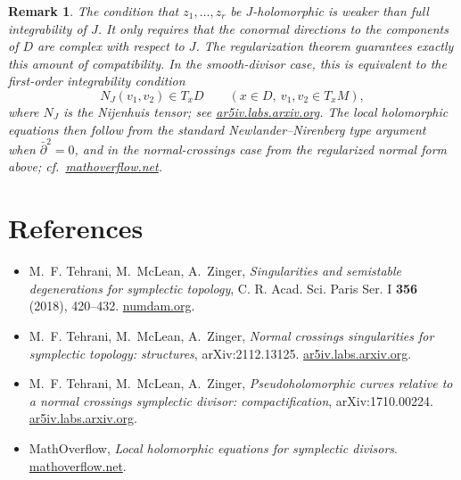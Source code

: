 \documentclass[11pt]{article}
\newtheorem{remark}[theorem]{Remark}
\begin{document}
\begin{remark}
The condition that $z_1,\dots,z_r$ be $J$-holomorphic is weaker than full integrability of $J$. It only requires that the conormal directions to the components of $D$ are complex with respect to $J$. The regularization theorem guarantees exactly this amount of compatibility. In the smooth-divisor case, this is equivalent to the first-order integrability condition
\[
N_J(v_1,v_2)\in T_xD\qquad(x\in D,\ v_1,v_2\in T_xM),
\]
where $N_J$ is the Nijenhuis tensor; see \href{https://ar5iv.labs.arxiv.org/html/1710.00224}{ar5iv.labs.arxiv.org}. The local holomorphic equations then follow from the standard Newlander--Nirenberg type argument when $\bar\partial^2=0$, and in the normal-crossings case from the regularized normal form above; cf.\ \href{https://mathoverflow.net/questions/154302/local-holomorphic-equations-for-symplectic-divisors}{mathoverflow.net}.
\end{remark}

\section*{References}
\begin{itemize}
\item M.~F. Tehrani, M.~McLean, A.~Zinger, \emph{Singularities and semistable degenerations for symplectic topology}, C. R. Acad. Sci. Paris Ser. I \textbf{356} (2018), 420--432. \href{https://www.numdam.org/item/10.1016/j.crma.2018.02.009.pdf}{numdam.org}.
\item M.~F. Tehrani, M.~McLean, A.~Zinger, \emph{Normal crossings singularities for symplectic topology: structures}, arXiv:2112.13125. \href{https://ar5iv.labs.arxiv.org/html/2112.13125}{ar5iv.labs.arxiv.org}.
\item M.~F. Tehrani, M.~McLean, A.~Zinger, \emph{Pseudoholomorphic curves relative to a normal crossings symplectic divisor: compactification}, arXiv:1710.00224. \href{https://ar5iv.labs.arxiv.org/html/1710.00224}{ar5iv.labs.arxiv.org}.
\item MathOverflow, \emph{Local holomorphic equations for symplectic divisors}. \href{https://mathoverflow.net/questions/154302/local-holomorphic-equations-for-symplectic-divisors}{mathoverflow.net}.
\end{itemize}
\end{document}
